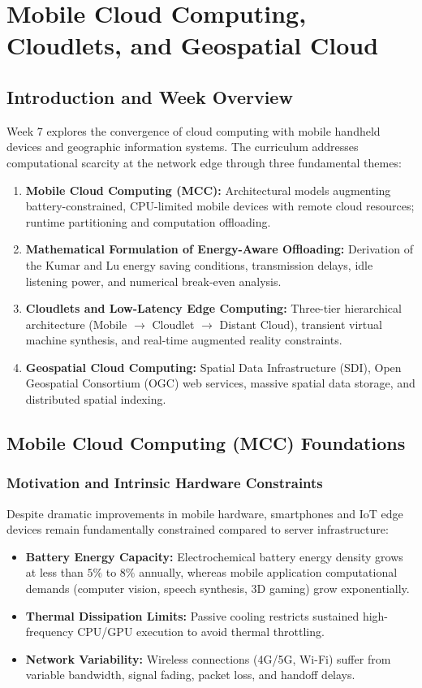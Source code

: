 \chapter{Mobile Cloud Computing, Cloudlets, and Geospatial Cloud}

\section{Introduction and Week Overview}
Week 7 explores the convergence of cloud computing with mobile handheld devices and geographic information systems. The curriculum addresses computational scarcity at the network edge through three fundamental themes:
\begin{enumerate}[leftmargin=*]
  \item \textbf{Mobile Cloud Computing (MCC):} Architectural models augmenting battery-constrained, CPU-limited mobile devices with remote cloud resources; runtime partitioning and computation offloading.
  \item \textbf{Mathematical Formulation of Energy-Aware Offloading:} Derivation of the Kumar and Lu energy saving conditions, transmission delays, idle listening power, and numerical break-even analysis.
  \item \textbf{Cloudlets and Low-Latency Edge Computing:} Three-tier hierarchical architecture (Mobile $\to$ Cloudlet $\to$ Distant Cloud), transient virtual machine synthesis, and real-time augmented reality constraints.
  \item \textbf{Geospatial Cloud Computing:} Spatial Data Infrastructure (SDI), Open Geospatial Consortium (OGC) web services, massive spatial data storage, and distributed spatial indexing.
\end{enumerate}

\section{Mobile Cloud Computing (MCC) Foundations}
\subsection{Motivation and Intrinsic Hardware Constraints}
Despite dramatic improvements in mobile hardware, smartphones and IoT edge devices remain fundamentally constrained compared to server infrastructure:
\begin{itemize}[leftmargin=*]
  \item \textbf{Battery Energy Capacity:} Electrochemical battery energy density grows at less than $5\%$ to $8\%$ annually, whereas mobile application computational demands (computer vision, speech synthesis, 3D gaming) grow exponentially.
  \item \textbf{Thermal Dissipation Limits:} Passive cooling restricts sustained high-frequency CPU/GPU execution to avoid thermal throttling.
  \item \textbf{Network Variability:} Wireless connections (4G/5G, Wi-Fi) suffer from variable bandwidth, signal fading, packet loss, and handoff delays.
\end{itemize}

